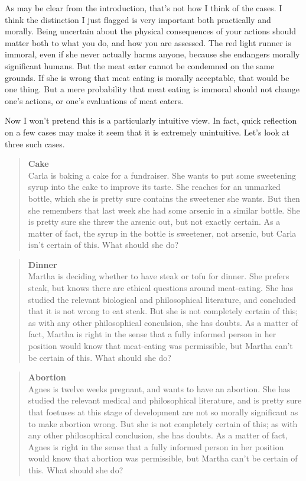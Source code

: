 \documentclass[
  11pt,
  letterpaper,
  DIV=11,
  numbers=noendperiod,
  twoside]{scrartcl}
\begin{document}
As may be clear from the introduction, that's not how I think of the
cases. I think the distinction I just flagged is very important both
practically and morally. Being uncertain about the physical consequences
of your actions should matter both to what you do, and how you are
assessed. The red light runner is immoral, even if she never actually
harms anyone, because she endangers morally significant humans. But the
meat eater cannot be condemned on the same grounds. If she is wrong that
meat eating is morally acceptable, that would be one thing. But a mere
probability that meat eating is immoral should not change one's actions,
or one's evaluations of meat eaters.

Now I won't pretend this is a particularly intuitive view. In fact,
quick reflection on a few cases may make it seem that it is extremely
unintuitive. Let's look at three such cases.

\begin{quote}
\textbf{Cake}\\
Carla is baking a cake for a fundraiser. She wants to put some
sweetening syrup into the cake to improve its taste. She reaches for an
unmarked bottle, which she is pretty sure contains the sweetener she
wants. But then she remembers that last week she had some arsenic in a
similar bottle. She is pretty sure she threw the arsenic out, but not
exactly certain. As a matter of fact, the syrup in the bottle is
sweetener, not arsenic, but Carla isn't certain of this. What should she
do?
\end{quote}

\begin{quote}
\textbf{Dinner}\\
Martha is deciding whether to have steak or tofu for dinner. She prefers
steak, but knows there are ethical questions around meat-eating. She has
studied the relevant biological and philosophical literature, and
concluded that it is not wrong to eat steak. But she is not completely
certain of this; as with any other philosophical conculsion, she has
doubts. As a matter of fact, Martha is right in the sense that a fully
informed person in her position would know that meat-eating was
permissible, but Martha can't be certain of this. What should she do?
\end{quote}

\begin{quote}
\textbf{Abortion}\\
Agnes is twelve weeks pregnant, and wants to have an abortion. She has
studied the relevant medical and philosophical literature, and is pretty
sure that foetuses at this stage of development are not so morally
significant as to make abortion wrong. But she is not completely certain
of this; as with any other philosophical conclusion, she has doubts. As
a matter of fact, Agnes is right in the sense that a fully informed
person in her position would know that abortion was permissible, but
Martha can't be certain of this. What should she do?
\end{quote}
\end{document}
